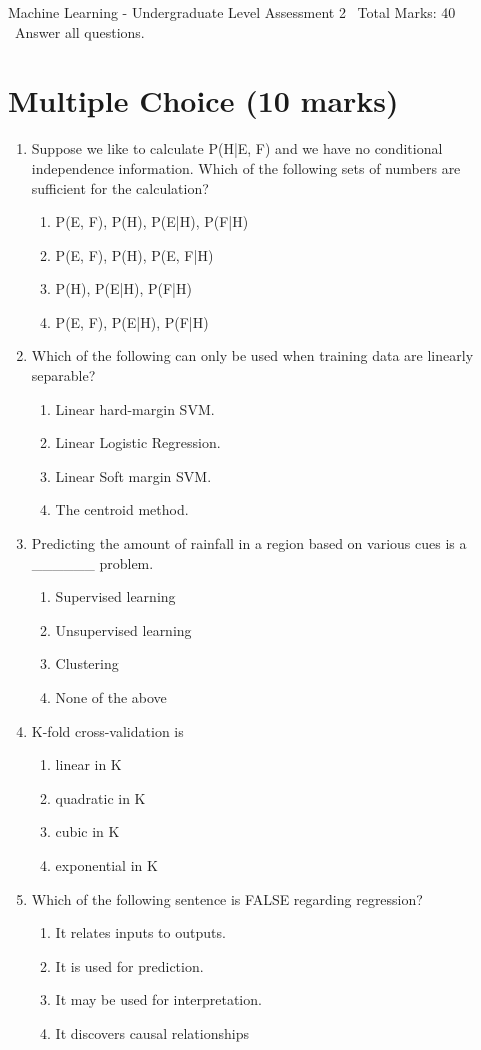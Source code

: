 \documentclass[12pt]{article}
\begin{document}
\begin{center}
Machine Learning - Undergraduate Level Assessment 2 \
Total Marks: 40 \
Answer all questions.
\end{center}

\section*{Multiple Choice (10 marks)}
\begin{enumerate}[label=\arabic*.]
\item Suppose we like to calculate P(H|E, F) and we have no conditional independence information. Which of the following sets of numbers are sufficient for the calculation?
\begin{enumerate}[label=(\alph*)]
    \item P(E, F), P(H), P(E|H), P(F|H)
    \item P(E, F), P(H), P(E, F|H)
    \item P(H), P(E|H), P(F|H)
    \item P(E, F), P(E|H), P(F|H)
\end{enumerate}
\item Which of the following can only be used when training data are linearly separable?
\begin{enumerate}[label=(\alph*)]
    \item Linear hard-margin SVM.
    \item Linear Logistic Regression.
    \item Linear Soft margin SVM.
    \item The centroid method.
\end{enumerate}
\item Predicting the amount of rainfall in a region based on various cues is a \_\_\_\_\_\_ problem.
\begin{enumerate}[label=(\alph*)]
    \item Supervised learning
    \item Unsupervised learning
    \item Clustering
    \item None of the above
\end{enumerate}
\item K-fold cross-validation is
\begin{enumerate}[label=(\alph*)]
    \item linear in K
    \item quadratic in K
    \item cubic in K
    \item exponential in K
\end{enumerate}
\item Which of the following sentence is FALSE regarding regression?
\begin{enumerate}[label=(\alph*)]
    \item It relates inputs to outputs.
    \item It is used for prediction.
    \item It may be used for interpretation.
    \item It discovers causal relationships
\end{enumerate}
\end{enumerate}
\end{document}

